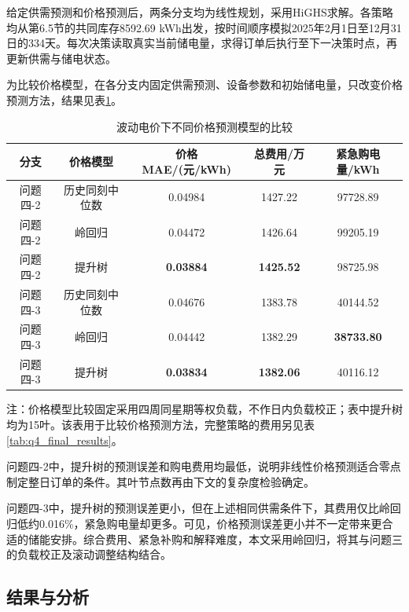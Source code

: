 给定供需预测和价格预测后，两条分支均为线性规划，采用HiGHS求解。各策略均从第6.5节的共同库存8592.69 kWh出发，按时间顺序模拟2025年2月1日至12月31日的334天。每次决策读取真实当前储电量，求得订单后执行至下一决策时点，再更新供需与储电状态。

为比较价格模型，在各分支内固定供需预测、设备参数和初始储电量，只改变价格预测方法，结果见表\ref{tab:q4_price_comparison}。

\begin{table}[H]
    \centering
    \caption{波动电价下不同价格预测模型的比较}
    \label{tab:q4_price_comparison}
    \begin{tabular}{ccccc}
        \hline
        分支 & 价格模型 & 价格MAE/(元/kWh) & 总费用/万元 & 紧急购电量/kWh \\
        \hline
        问题四-2 & 历史同刻中位数 & 0.04984 & 1427.22 & 97728.89 \\
        问题四-2 & 岭回归 & 0.04472 & 1426.64 & 99205.19 \\
        问题四-2 & 提升树 & \textbf{0.03884} & \textbf{1425.52} & 98725.98 \\
        \hline
        问题四-3 & 历史同刻中位数 & 0.04676 & 1383.78 & 40144.52 \\
        问题四-3 & 岭回归 & 0.04442 & 1382.29 & \textbf{38733.80} \\
        问题四-3 & 提升树 & \textbf{0.03834} & \textbf{1382.06} & 40116.12 \\
        \hline
    \end{tabular}
    \par\smallskip
    \begin{minipage}{0.96\textwidth}
    \small 注：价格模型比较固定采用四周同星期等权负载，不作日内负载校正；表中提升树均为15叶。该表用于比较价格预测方法，完整策略的费用另见表\ref{tab:q4_final_results}。
    \end{minipage}
\end{table}

问题四-2中，提升树的预测误差和购电费用均最低，说明非线性价格预测适合零点制定整日订单的条件。其叶节点数再由下文的复杂度检验确定。

问题四-3中，提升树的预测误差更小，但在上述相同供需条件下，其费用仅比岭回归低约0.016\%，紧急购电量却更多。可见，价格预测误差更小并不一定带来更合适的储能安排。综合费用、紧急补购和解释难度，本文采用岭回归，将其与问题三的负载校正及滚动调整结构结合。

\subsection{结果与分析}

